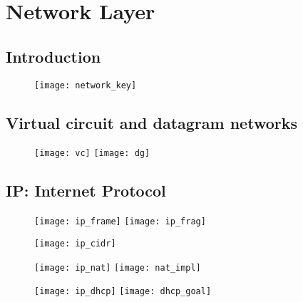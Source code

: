 \section{Network Layer}

\subsection{Introduction}

\begin{figure}[H]
  \centering
  \texttt{[image: network\_key]}
\end{figure}

\subsection{Virtual circuit and datagram networks}

\begin{figure}[H]
  \centering
  \texttt{[image: vc]}
  \texttt{[image: dg]}
\end{figure}

\subsection{IP: Internet Protocol}

\begin{figure}[H]
  \centering
  \texttt{[image: ip\_frame]}
  \texttt{[image: ip\_frag]}
\end{figure}

\begin{figure}[H]
  \centering
  \texttt{[image: ip\_cidr]}
\end{figure}


\begin{figure}[H]
  \centering
  \texttt{[image: ip\_nat]}
  \texttt{[image: nat\_impl]}
\end{figure}

\begin{figure}[H]
  \centering
  \texttt{[image: ip\_dhcp]}
  \texttt{[image: dhcp\_goal]}
\end{figure}

